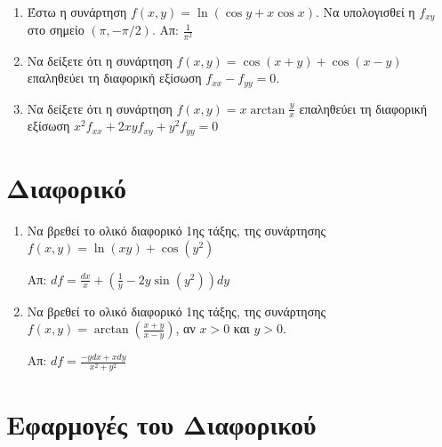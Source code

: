 \begin{enumerate}
  \item Έστω η συνάρτηση $f(x,y)=\ln\left(\cos y+x\cos x\right)$.  Να υπολογισθεί 
    η $ f_{xy} $ στο σημείο $(\pi,-\pi/2)$.  \hfill Απ: $\frac{1}{\pi^2}$



  \item Να δείξετε ότι η συνάρτηση $ f(x,y) = \cos{(x+y)} + \cos{(x-y)} $ 
    επαληθεύει τη διαφορική εξίσωση $ f_{xx} - f_{yy} = 0 $.

  \item Να δείξετε ότι η συνάρτηση $ f(x,y) = x \arctan{\frac{y}{x}} $ 
    επαληθεύει τη διαφορική εξίσωση $ x^{2} f_{xx} + 2xyf_{xy} + y^{2} f_{yy} = 0 $ 
\end{enumerate}


\section*{Διαφορικό}

\begin{enumerate}
  \item Να βρεθεί το ολικό διαφορικό 1ης τάξης, της συνάρτησης 
    $f(x,y)=\ln(xy)+\cos(y^2)$ 

    \hfill Απ: $df=\frac{dx}{x}+\left(\frac{1}{y}-2y\sin(y^2)\right)dy$

  \item Να βρεθεί το ολικό διαφορικό 1ης τάξης, της συνάρτησης 
    $ f(x,y) = \arctan(\frac{ x+y }{ x-y }) $, αν $ x>0 $ και $ y>0 $.

    \hfill Απ: $df = \frac{ -ydx + xdy }{ x^{2} + y^{2} } $ 



\end{enumerate}


\section*{Εφαρμογές του Διαφορικού}

